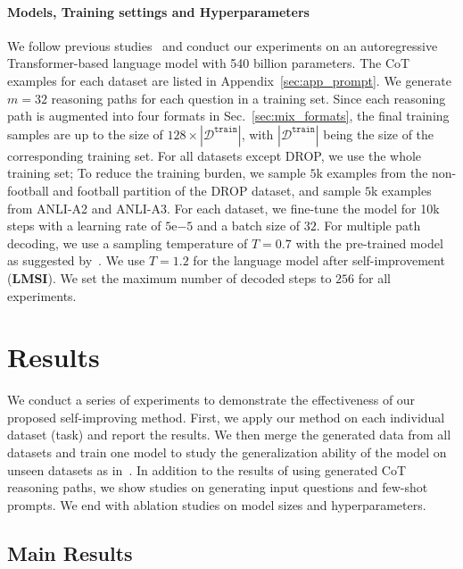 \documentclass{article} %
\newcommand{\Dcal}{\mathcal{D}}
\newcommand{\method}{\textbf{LMSI}\xspace}
\begin{document}
\paragraph{Models, Training settings and Hyperparameters}
We follow previous studies~\citep{Wei2022ChainOT, Wang2022SelfConsistencyIC} and conduct our experiments on an autoregressive Transformer-based language model with 540 billion parameters. The CoT examples for each dataset are listed in Appendix~\ref{sec:app_prompt}. 
We generate $m=32$ reasoning paths for each question in a training set. Since each reasoning path is augmented into four formats in Sec.~\ref{sec:mix_formats}, the final training samples are up to the size of $128\times |\Dcal^\mathtt{train}|$, with $|\Dcal^\mathtt{train}|$ being the size of the corresponding training set. 
For all datasets except DROP, we use the whole training set; To reduce the training burden, we sample $5$k examples from the non-football and football partition of the DROP dataset, and sample $5$k examples from ANLI-A2 and ANLI-A3.
For each dataset, we fine-tune the model for 10k steps with a learning rate of $5$e$-5$ and a batch size of $32$.
For multiple path decoding, we use a sampling temperature of $T=0.7$ with the pre-trained model as suggested by~\cite{Wang2022SelfConsistencyIC}. We use $T=1.2$ for the language model after self-improvement (\method). We set the maximum number of decoded steps to $256$ for all experiments.






\section{Results}
\label{sec:results}
We conduct a series of experiments to demonstrate the effectiveness of our proposed self-improving method. First, we apply our method on each individual dataset (task) and report the results. We then merge the generated data from all datasets and train one model to study the generalization ability of the model on unseen datasets as in~\citep{wei2021finetuned}. In addition to the results of using generated CoT reasoning paths, we show studies on generating input questions and few-shot prompts. We end with ablation studies on model sizes and hyperparameters.

\subsection{Main Results}
\end{document}
